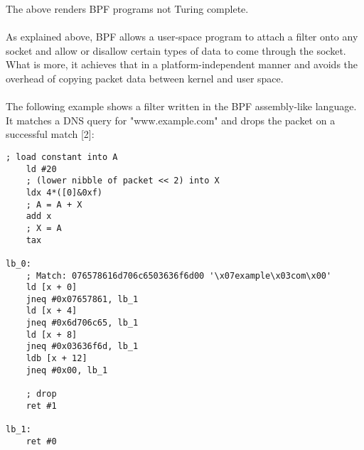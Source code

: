 \documentclass{l4proj}
\begin{document}
The above renders BPF programs not Turing complete.
\\\\
As explained above, BPF allows a user-space program to attach a filter onto any socket and allow or disallow certain types of data to come through the socket. What is more, it achieves that in a platform-independent manner and avoids the overhead of copying packet data between kernel and user space.\\\\
The following example shows a filter written in the BPF assembly-like language. It matches a DNS query for "www.example.com" and drops the packet on a successful match [2]:
\begin{lstlisting}[language=ebpfAsm]
    ; load constant into A
    ld #20
    ; (lower nibble of packet << 2) into X
    ldx 4*([0]&0xf)
    ; A = A + X
    add x
    ; X = A
    tax

lb_0:
    ; Match: 076578616d706c6503636f6d00 '\x07example\x03com\x00'
    ld [x + 0]
    jneq #0x07657861, lb_1
    ld [x + 4]
    jneq #0x6d706c65, lb_1
    ld [x + 8]
    jneq #0x03636f6d, lb_1
    ldb [x + 12]
    jneq #0x00, lb_1
    
    ; drop
    ret #1

lb_1:
    ret #0
\end{lstlisting}
\end{document}
